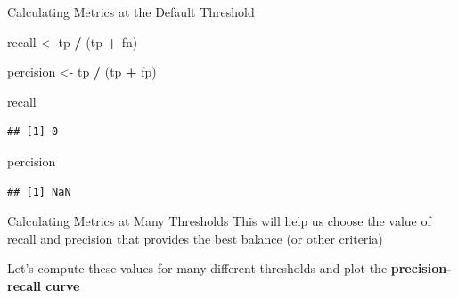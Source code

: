 \documentclass[
  ignorenonframetext,
]{beamer}
\newenvironment{Shaded}{\begin{snugshade}}{\end{snugshade}}
\newcommand{\NormalTok}[1]{#1}
\newcommand{\OtherTok}[1]{\textcolor[rgb]{0.56,0.35,0.01}{#1}}
\newcommand{\SpecialCharTok}[1]{\textcolor[rgb]{0.81,0.36,0.00}{\textbf{#1}}}
\begin{document}
\begin{frame}[fragile]{Calculating Metrics at the Default Threshold}
\label{calculating-metrics-at-the-default-threshold-1}
\scriptsize

\begin{Shaded}
\begin{Highlighting}[]
\NormalTok{recall }\OtherTok{\textless{}{-}}\NormalTok{ tp }\SpecialCharTok{/}\NormalTok{ (tp }\SpecialCharTok{+}\NormalTok{ fn)}

\NormalTok{percision }\OtherTok{\textless{}{-}}\NormalTok{ tp }\SpecialCharTok{/}\NormalTok{ (tp }\SpecialCharTok{+}\NormalTok{ fp)}

\NormalTok{recall}
\end{Highlighting}
\end{Shaded}

\begin{verbatim}
## [1] 0
\end{verbatim}

\begin{Shaded}
\begin{Highlighting}[]
\NormalTok{percision}
\end{Highlighting}
\end{Shaded}

\begin{verbatim}
## [1] NaN
\end{verbatim}
\end{frame}

\begin{frame}{Calculating Metrics at Many Thresholds}
\label{calculating-metrics-at-many-thresholds}
This will help us choose the value of recall and precision that provides
the best balance (or other criteria)

Let's compute these values for many different thresholds and plot the
\textbf{precision-recall curve}
\end{frame}
\end{document}
